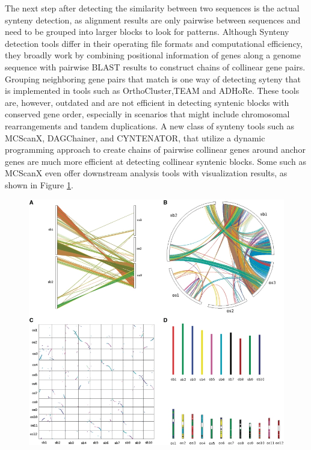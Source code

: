 The next step after detecting the similarity between two sequences is the actual synteny detection, as alignment results are only pairwise between sequences and need to be grouped into larger blocks to look for patterns. Although Synteny detection tools differ in their operating file formats and computational efficiency, they broadly work by combining positional information of genes along a genome sequence with pairwise BLAST results to construct chains of collinear gene pairs. Grouping neighboring gene pairs that match is one way of detecting syteny\cite{wang2012mcscanx} that is implemented in tools such as OrthoCluster\cite{zeng2008orthocluster},TEAM\cite{luc2003gene} and ADHoRe\cite{proost2011adhore}. These tools are, however, outdated and are not efficient in detecting syntenic blocks with conserved gene order, especially in scenarios that might include chromosomal rearrangements and tandem duplications\cite{wang2012mcscanx}. A new class of synteny tools such as MCScanX\cite{wang2012mcscanx}, DAGChainer\cite{haas2004dagchainer}, and CYNTENATOR\cite{rodelsperger2010cyntenator}, that utilize a dynamic programming approach to create chains of pairwise collinear genes around anchor genes are much more efficient at detecting collinear syntenic blocks. Some such as MCScanX even offer downstream analysis tools with visualization results, as shown in Figure \ref{fig:ch_2_synteny_plots}.     

\begin{figure}
  \centering
  \includegraphics[width=.75\linewidth]{images/ch_2_synteny_plots.jpg}
  \label{fig:ch_2_synteny_plots}
\end{figure}

